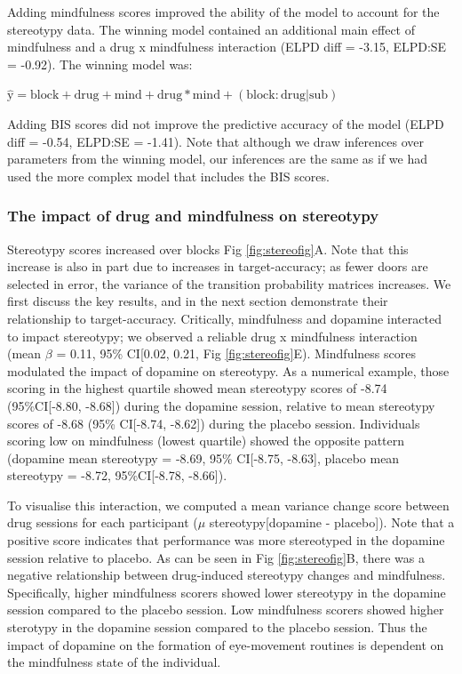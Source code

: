 \documentclass[
  man]{apa6}
\begin{document}
Adding mindfulness scores improved the ability of the model to account for the stereotypy data. The winning model contained an additional main effect of mindfulness and a drug x mindfulness interaction (ELPD diff = -3.15, ELPD:SE = -0.92). The winning model was:

\(\mathrm{\hat{y}} = \mathrm{block} + \mathrm{drug} + \mathrm{mind} + \mathrm{drug*mind} + \mathrm{(block:drug|sub)}\)

Adding BIS scores did not improve the predictive accuracy of the model (ELPD diff = -0.54, ELPD:SE = -1.41). Note that although we draw inferences over parameters from the winning model, our inferences are the same as if we had used the more complex model that includes the BIS scores.

\hypertarget{the-impact-of-drug-and-mindfulness-on-stereotypy}{%
\subsubsection{The impact of drug and mindfulness on stereotypy}\label{the-impact-of-drug-and-mindfulness-on-stereotypy}}

Stereotypy scores increased over blocks Fig \ref{fig:stereofig}A. Note that this increase is also in part due to increases in target-accuracy; as fewer doors are selected in error, the variance of the transition probability matrices increases. We first discuss the key results, and in the next section demonstrate their relationship to target-accuracy. Critically, mindfulness and dopamine interacted to impact stereotypy; we observed a reliable drug x mindfulness interaction (mean \(\beta\) = 0.11, 95\% CI{[}0.02, 0.21, Fig \ref{fig:stereofig}E). Mindfulness scores modulated the impact of dopamine on stereotypy. As a numerical example, those scoring in the highest quartile showed mean stereotypy scores of -8.74 (95\%CI{[}-8.80, -8.68{]}) during the dopamine session, relative to mean stereotypy scores of -8.68 (95\% CI{[}-8.74, -8.62{]}) during the placebo session. Individuals scoring low on mindfulness (lowest quartile) showed the opposite pattern (dopamine mean stereotypy = -8.69, 95\% CI{[}-8.75, -8.63{]}, placebo mean stereotypy = -8.72, 95\%CI{[}-8.78, -8.66{]}).

To visualise this interaction, we computed a mean variance change score between drug sessions for each participant (\(\mu\) stereotypy{[}dopamine - placebo{]}). Note that a positive score indicates that performance was more stereotyped in the dopamine session relative to placebo. As can be seen in Fig \ref{fig:stereofig}B, there was a negative relationship between drug-induced stereotypy changes and mindfulness. Specifically, higher mindfulness scorers showed lower stereotypy in the dopamine session compared to the placebo session. Low mindfulness scorers showed higher sterotypy in the dopamine session compared to the placebo session. Thus the impact of dopamine on the formation of eye-movement routines is dependent on the mindfulness state of the individual.
\end{document}
